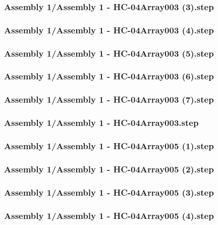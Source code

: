 \documentclass[a4paper,12pt]{article}
\begin{document}
\begin{lstlising}[language=C++]
\subsubsection{Assembly 1/Assembly 1 - HC-04Array003 (3).step}

\subsubsection{Assembly 1/Assembly 1 - HC-04Array003 (4).step}

\subsubsection{Assembly 1/Assembly 1 - HC-04Array003 (5).step}

\subsubsection{Assembly 1/Assembly 1 - HC-04Array003 (6).step}

\subsubsection{Assembly 1/Assembly 1 - HC-04Array003 (7).step}

\subsubsection{Assembly 1/Assembly 1 - HC-04Array003.step}

\subsubsection{Assembly 1/Assembly 1 - HC-04Array005 (1).step}

\subsubsection{Assembly 1/Assembly 1 - HC-04Array005 (2).step}

\subsubsection{Assembly 1/Assembly 1 - HC-04Array005 (3).step}

\subsubsection{Assembly 1/Assembly 1 - HC-04Array005 (4).step}


\end{lstlising}
\end{document}
